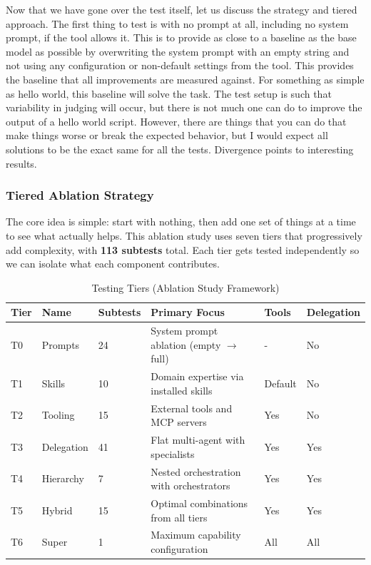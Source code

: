 \documentclass[11pt]{article}
\begin{document}
Now that we have gone over the test itself, let us discuss the strategy and tiered
approach. The first thing to test is with no prompt at all, including no system
prompt, if the tool allows it. This is to provide as close to a baseline as the
base model as possible by overwriting the system prompt with an empty string and
not using any configuration or non-default settings from the tool. This provides
the baseline that all improvements are measured against. For something as simple
as hello world, this baseline will solve the task. The test setup is such that
variability in judging will occur, but there is not much one can do to improve
the output of a hello world script. However, there are things that you can do
that make things worse or break the expected behavior, but I would expect all
solutions to be the exact same for all the tests. Divergence points to
interesting results.

\subsubsection{Tiered Ablation Strategy}\label{sec:tiered-ablation}

The core idea is simple: start with nothing, then add one set of things at a
time to see what actually helps. This ablation study uses seven tiers that
progressively add complexity, with \textbf{113 subtests} total. Each tier gets
tested independently so we can isolate what each component contributes.

\begin{table}[htbp]
\centering
\caption{Testing Tiers (Ablation Study Framework)}
\begin{tabularx}{\textwidth}{llXllX}
\toprule
Tier & Name & Subtests & Primary Focus & Tools & Delegation \\
\midrule
T0 & Prompts & 24 & System prompt ablation (empty $\rightarrow$ full) & - & No \\
T1 & Skills & 10 & Domain expertise via installed skills & Default & No \\
T2 & Tooling & 15 & External tools and MCP servers & Yes & No \\
T3 & Delegation & 41 & Flat multi-agent with specialists & Yes & Yes \\
T4 & Hierarchy & 7 & Nested orchestration with orchestrators & Yes & Yes \\
T5 & Hybrid & 15 & Optimal combinations from all tiers & Yes & Yes \\
T6 & Super & 1 & Maximum capability configuration & All & All \\
\bottomrule
\end{tabularx}
\end{table}
\end{document}
